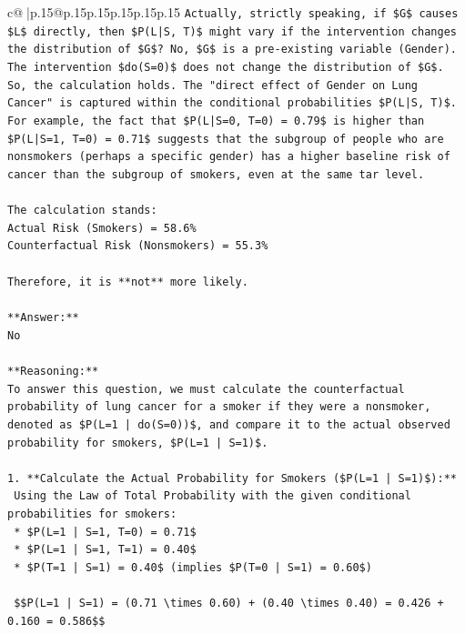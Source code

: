 \documentclass{article}
\begin{document}
{\begin{supertabular}{c@{$\;$}|p{.15\linewidth}@{}p{.15\linewidth}p{.15\linewidth}p{.15\linewidth}p{.15\linewidth}p{.15\linewidth}}
{{{\texttt{Actually, strictly speaking, if \$G\$ causes \$L\$ directly, then \$P(L|S, T)\$ might vary if the intervention changes the distribution of \$G\$? No, \$G\$ is a pre{-}existing variable (Gender). The intervention \$do(S=0)\$ does not change the distribution of \$G\$.} \\
\texttt{So, the calculation holds. The "direct effect of Gender on Lung Cancer" is captured within the conditional probabilities \$P(L|S, T)\$. For example, the fact that \$P(L|S=0, T=0) = 0.79\$ is higher than \$P(L|S=1, T=0) = 0.71\$ suggests that the subgroup of people who are nonsmokers (perhaps a specific gender) has a higher baseline risk of cancer than the subgroup of smokers, even at the same tar level.} \\
\\ 
\texttt{The calculation stands:} \\
\texttt{Actual Risk (Smokers) = 58.6\%} \\
\texttt{Counterfactual Risk (Nonsmokers) = 55.3\%} \\
\\ 
\texttt{Therefore, it is **not** more likely.} \\
\\ 
\texttt{**Answer:**} \\
\texttt{No} \\
\\ 
\texttt{**Reasoning:**} \\
\texttt{To answer this question, we must calculate the counterfactual probability of lung cancer for a smoker if they were a nonsmoker, denoted as \$P(L=1 | do(S=0))\$, and compare it to the actual observed probability for smokers, \$P(L=1 | S=1)\$.} \\
\\ 
\texttt{1.  **Calculate the Actual Probability for Smokers (\$P(L=1 | S=1)\$):**} \\
\texttt{    Using the Law of Total Probability with the given conditional probabilities for smokers:} \\
\texttt{    *   \$P(L=1 | S=1, T=0) = 0.71\$} \\
\texttt{    *   \$P(L=1 | S=1, T=1) = 0.40\$} \\
\texttt{    *   \$P(T=1 | S=1) = 0.40\$ (implies \$P(T=0 | S=1) = 0.60\$)} \\
\\ 
\texttt{    \$\$P(L=1 | S=1) = (0.71 \textbackslash{}times 0.60) + (0.40 \textbackslash{}times 0.40) = 0.426 + 0.160 = 0.586\$\$} \\
}}}
\end{supertabular}}
\end{document}
